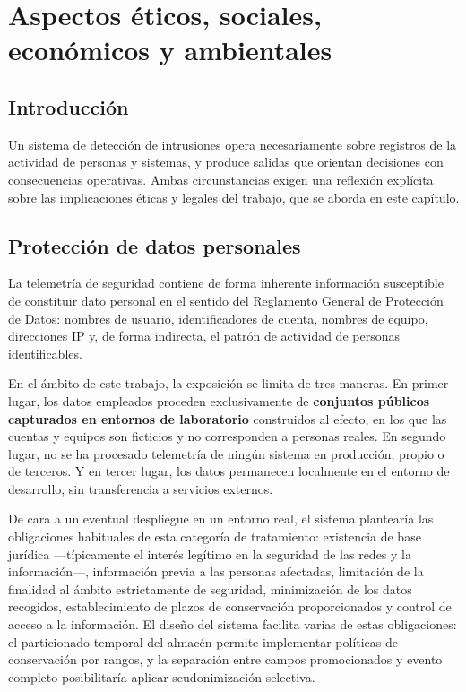 \chapter{Aspectos éticos, sociales, económicos y ambientales}
\label{cap:aspectos}

\section{Introducción}

Un sistema de detección de intrusiones opera necesariamente sobre registros de la actividad
de personas y sistemas, y produce salidas que orientan decisiones con consecuencias
operativas. Ambas circunstancias exigen una reflexión explícita sobre las implicaciones
éticas y legales del trabajo, que se aborda en este capítulo.

\section{Protección de datos personales}

La telemetría de seguridad contiene de forma inherente información susceptible de constituir
dato personal en el sentido del Reglamento General de Protección de Datos: nombres de
usuario, identificadores de cuenta, nombres de equipo, direcciones IP y, de forma indirecta,
el patrón de actividad de personas identificables.

En el ámbito de este trabajo, la exposición se limita de tres maneras. En primer lugar, los
datos empleados proceden exclusivamente de \textbf{conjuntos públicos capturados en entornos
de laboratorio} construidos al efecto, en los que las cuentas y equipos son ficticios y no
corresponden a personas reales. En segundo lugar, no se ha procesado telemetría de ningún
sistema en producción, propio o de terceros. Y en tercer lugar, los datos permanecen
localmente en el entorno de desarrollo, sin transferencia a servicios externos.

De cara a un eventual despliegue en un entorno real, el sistema plantearía las obligaciones
habituales de esta categoría de tratamiento: existencia de base jurídica —típicamente el
interés legítimo en la seguridad de las redes y la información—, información previa a las
personas afectadas, limitación de la finalidad al ámbito estrictamente de seguridad,
minimización de los datos recogidos, establecimiento de plazos de conservación proporcionados
y control de acceso a la información. El diseño del sistema facilita varias de estas
obligaciones: el particionado temporal del almacén permite implementar políticas de
conservación por rangos, y la separación entre campos promocionados y evento completo
posibilitaría aplicar seudonimización selectiva.

